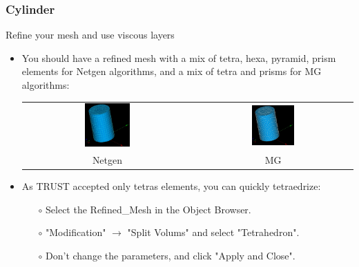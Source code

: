 \documentclass[10pt, hyperref={unicode=true,pdfusetitle, bookmarks=true,bookmarksnumbered=false,bookmarksopen=false, breaklinks=false,pdfborder={0 0 1},backref=true,colorlinks=true,linkcolor=darkblue,pageanchor}]{beamer}
\begin{document}
\begin{frame}
\frametitle{Cylinder}
\begin{block}{Refine your mesh and use viscous layers}

\begin{itemize}
\item You should have a refined mesh with a mix of tetra, hexa, pyramid, prism elements for Netgen algorithms, and a mix of tetra and prisms for MG algorithms:

\begin{center}
\begin{tabular}{cc}
\includegraphics[width=0.28\textwidth]{PICTURES/salome6a.jpg}
 & 
\includegraphics[width=0.28\textwidth]{PICTURES/salome6b.jpg}
\tabularnewline
Netgen & MG
\end{tabular}
\end{center}

\item As TRUST accepted only tetras elements, you can quickly tetraedrize:
    \begin{itemize}
    \item [$\circ$] Select the Refined\_Mesh in the Object Browser.
    \item [$\circ$] "Modification" $\rightarrow$ "Split Volums" and select "Tetrahedron".
    \item [$\circ$] Don't change the parameters, and click "Apply and Close".
    \end{itemize}
\end{itemize}

\end{block}
\end{frame}
\end{document}
